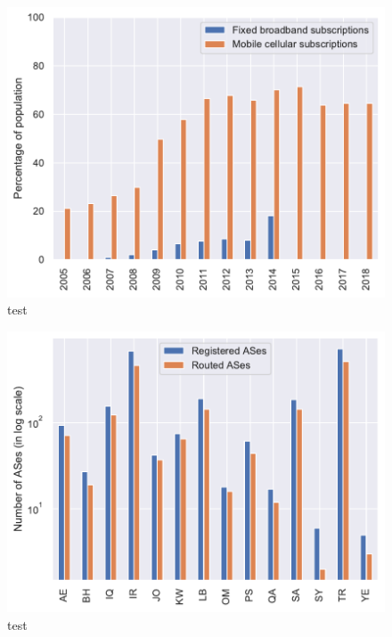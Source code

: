 \documentclass[a4paper,titlepage]{article}
\begin{document}
\begin{figure}
    \centering
    \includegraphics[width=0.75\linewidth]{../output/aggregate-lbs-users.pdf}
    \caption{test}
\end{figure}

\begin{figure}
    \centering
    \includegraphics[width=0.75\linewidth]{../output/as-stat.pdf}
    \caption{test}
\end{figure}


\end{document}
